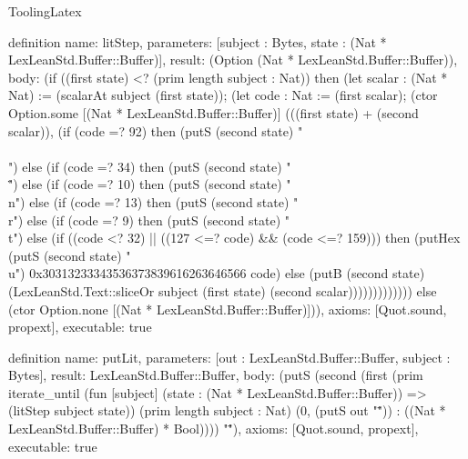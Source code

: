 \begin{lexlean}{ToolingLatex}
\begin{semanticmodule}
definition{
  name: litStep,
  parameters: [subject : Bytes, state : (Nat * LexLeanStd.Buffer::Buffer)],
  result: (Option (Nat * LexLeanStd.Buffer::Buffer)),
  body: (if ((first state) <? (prim length subject : Nat)) then (let scalar : (Nat * Nat) := (scalarAt subject (first state)); (let code : Nat := (first scalar); (ctor Option.some [(Nat * LexLeanStd.Buffer::Buffer)] (((first state) + (second scalar)), (if (code =? 92) then (putS (second state) "\\\\") else (if (code =? 34) then (putS (second state) "\\\"") else (if (code =? 10) then (putS (second state) "\\n") else (if (code =? 13) then (putS (second state) "\\r") else (if (code =? 9) then (putS (second state) "\\t") else (if ((code <? 32) || ((127 <=? code) && (code <=? 159))) then (putHex (putS (second state) "\\u") 0x30313233343536373839616263646566 code) else (putB (second state) (LexLeanStd.Text::sliceOr subject (first state) (second scalar))))))))))))) else (ctor Option.none [(Nat * LexLeanStd.Buffer::Buffer)])),
  axioms: [Quot.sound, propext],
  executable: true
}

definition{
  name: putLit,
  parameters: [out : LexLeanStd.Buffer::Buffer, subject : Bytes],
  result: LexLeanStd.Buffer::Buffer,
  body: (putS (second (first (prim iterate_until (fun [subject] (state : (Nat * LexLeanStd.Buffer::Buffer)) => (litStep subject state)) (prim length subject : Nat) (0, (putS out "\"")) : ((Nat * LexLeanStd.Buffer::Buffer) * Bool)))) "\""),
  axioms: [Quot.sound, propext],
  executable: true
}


\end{semanticmodule}
\end{lexlean}

